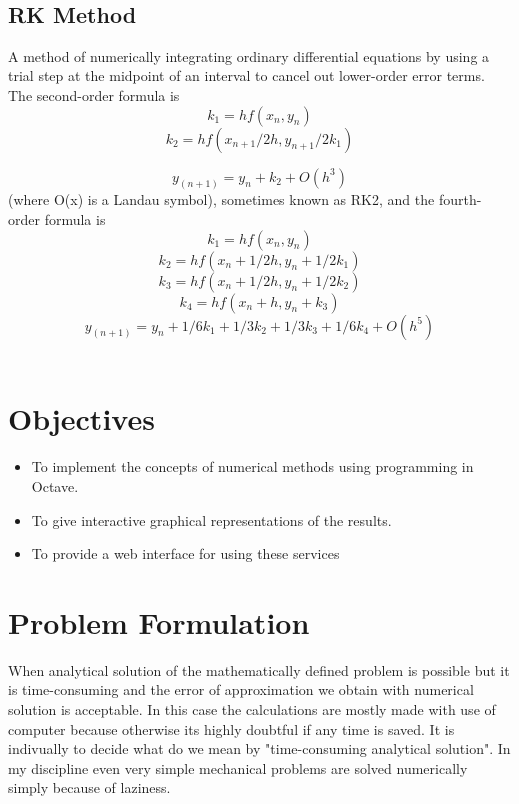  
 
\
\
\subsection{RK Method}

A method of numerically integrating ordinary differential equations by using a trial step at the midpoint of an interval to cancel out lower-order error terms. The second-order formula is
\begin{equation}
k_{1}	=	hf(x_{n},y_{n})
\end{equation}	
\begin{equation}
k_{2}	=	hf(x_{n+1}/2h,y_{n+1}/2k_{1})	
\end{equation}

\begin{equation}
y_(n+1)	=	y_n+k_2+O(h^3)	
\end{equation}
(where O(x) is a Landau symbol), sometimes known as RK2, and the fourth-order formula is
\begin{equation}
k_1	=	hf(x_n,y_n)	
\end{equation}
\begin{equation}
k_2	=	hf(x_n+1/2h,y_n+1/2k_1)	
\end{equation}
\begin{equation}
k_3	=	hf(x_n+1/2h,y_n+1/2k_2)	
\end{equation}
\begin{equation}
k_4	=	hf(x_n+h,y_n+k_3)
\end{equation}
\begin{equation}	
y_(n+1)	=	y_n+1/6k_1+1/3k_2+1/3k_3+1/6k_4+O(h^5)
\end{equation}
\
\

\section{Objectives}
\begin{itemize}
\item To implement the concepts of numerical methods using programming in Octave.
\item To give interactive graphical representations of the results.
\item To provide a web interface for using these services
\end{itemize}
\newpage
\section{Problem Formulation}
When analytical solution of the mathematically defined problem is possible but it is time-consuming and the error of approximation we obtain with numerical solution is acceptable. In this case the calculations are mostly made with use of computer because otherwise its highly doubtful if any time is saved. It is indivually to decide what do we mean by "time-consuming analytical solution". In my discipline even very simple mechanical problems are solved numerically simply because of laziness. \\

